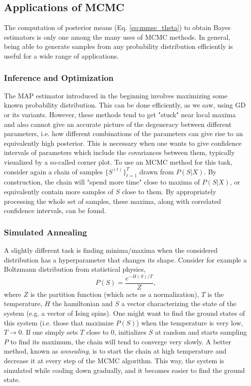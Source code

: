 \documentclass{article}
\begin{document}
\subsection{Applications of MCMC}
The computation of posterior means (Eq. \ref{eq:mmse_theta}) to obtain Bayes estimators is only one among the many uses of MCMC methods. In general, being able to generate samples from any probability distribution efficiently is useful for a wide range of applications.
\subsubsection*{Inference and Optimization}
The MAP estimator introduced in the beginning involves maximizing some known probability distribution. This can be done efficiently, as we saw, using GD or its variants. However, these methods tend to get "stuck" near local maxima and also cannot give an accurate picture of the degeneracy between different parameters, i.e. how different combinations of the parameters can give rise to an equivalently high posterior. This is necessary when one wants to give confidence intervals of parameters which include the covariances between them, typically visualized by a so-called corner plot. To use an MCMC method for this task, consider again a chain of samples $\{S^{(t)}\}_{t=1}^T$ drawn from $P(S | X)$. By construction, the chain will "spend more time" close to maxima of $P(S | X)$, or equivalently contain more samples of $S$ close to them. By appropriately processing the whole set of samples, these maxima, along with correlated confidence intervals, can be found.
\subsubsection*{Simulated Annealing}
A slightly different task is finding minima/maxima when the considered distribution has a hyperparameter that changes its shape. Consider for example a Boltzmann distribution from statistical physics,
\begin{equation}
    P(S) = \frac{e^{-H(S)/T}}{Z},
\end{equation}
where $Z$ is the partition function (which acts as a normalization), $T$ is the temperature, $H$ the hamiltonian and $S$ a vector characterizing the state of the system (e.g. a vector of Ising spins). One might want to find the ground states of this system (i.e. those that maximize $P(S)$) when the temperature is very low, $T\rightarrow 0$. If one simply sets $T$ close to 0, initializes $S$ at random and starts sampling $P$ to find its maximum, the chain will tend to converge very slowly. A better method, known as \emph{annealing}, is to start the chain at high temperature and decrease it at every step of the MCMC algorithm. This way, the system is simulated while cooling down gradually, and it becomes easier to find the ground state.
\end{document}
